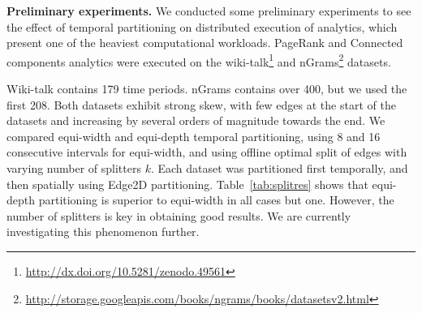 {\bf Preliminary experiments.}  We conducted some preliminary
experiments to see the effect of temporal partitioning on distributed
execution of analytics, which present one of the heaviest
computational workloads.  PageRank and Connected components analytics
were executed on the wiki-talk\footnote{\url{http://dx.doi.org/10.5281/zenodo.49561}} and nGrams\footnote{\url{http://storage.googleapis.com/books/ngrams/books/datasetsv2.html}}
datasets.

Wiki-talk contains 179 time periods.  nGrams contains over 400, but we
used the first 208.  Both datasets exhibit strong skew, with few edges
at the start of the datasets and increasing by several orders of
magnitude towards the end.  We compared equi-width and equi-depth
temporal partitioning, using 8 and 16 consecutive intervals for
equi-width, and using offline optimal split of edges with varying
number of splitters $k$.  Each dataset was partitioned first
temporally, and then spatially using Edge2D partitioning.
Table~\ref{tab:splitres} shows that equi-depth partitioning is
superior to equi-width in all cases but one.  However, the number of
splitters is key in obtaining good results.  We are currently
investigating this phenomenon further.

